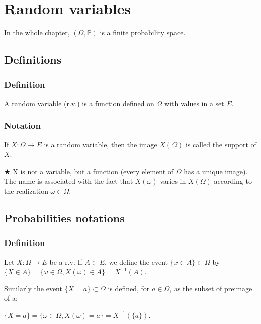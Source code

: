 \section{Random variables}
        In the whole chapter, $(\Omega, \mathbb{P})$ is a finite probability space.

        \subsection{Definitions}
            \subsubsection{Definition}
                A random variable (r.v.) is a function defined on $\Omega$ with values in a set $E$.

            \subsubsection{Notation}
                If $X: \Omega \rightarrow E$ is a random variable, then the image $X(\Omega)$ is called the support of $X$.

            \vspace{6pt}

            $\bigstar$ X is not a variable, but a function (every element of $\Omega$ has a unique image). The name is associated with the fact that $X(\omega)$ varies in $X(\Omega)$ according to the realization $\omega \in \Omega$.

        \subsection{Probabilities notations}
            \subsubsection{Definition}
                Let $X: \Omega \rightarrow E$ be a r.v. If $A \subset E$, we define the event $\{x\in A\} \subset \Omega$ by $\{ X \in A \} = \{ \omega \in \Omega, X(\omega)\in A\} = X^{-1}(A)$.

                \vspace{5pt}

                Similarly the event $\{X=a\} \subset \Omega$ is defined, for $a \in \Omega$, as the subset of preimage of a:

                \centerline{$\{X=a\}=\{\omega\in\Omega, X(\omega)=a\} = X^{-1}(\{a\})$.}

